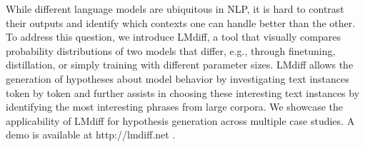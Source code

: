 While different language models are ubiquitous in NLP, it is hard to contrast their outputs and identify which contexts one can handle better than the other. To address this question, we introduce LMdiff, a tool that visually compares probability distributions of two models that differ, e.g., through finetuning, distillation, or simply training with different parameter sizes. LMdiff allows the generation of hypotheses about model behavior by investigating text instances token by token and further assists in choosing these interesting text instances by identifying the most interesting phrases from large corpora. We showcase the applicability of LMdiff for hypothesis generation across multiple case studies. 
 A demo is available at http://lmdiff.net .